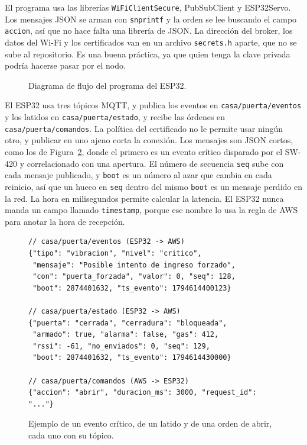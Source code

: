 \documentclass[manuscript,screen,nonacm]{acmart}
\begin{document}
El programa usa las librerías \texttt{WiFiClientSecure}, PubSubClient y ESP32Servo. Los mensajes JSON se arman con \texttt{snprintf} y la orden se lee buscando el campo \texttt{accion}, así que no hace falta una librería de JSON. La dirección del broker, los datos del Wi-Fi y los certificados van en un archivo \texttt{secrets.h} aparte, que no se sube al repositorio. Es una buena práctica, ya que quien tenga la clave privada podría hacerse pasar por el nodo.

\begin{figure}[htbp]
\centering
{}
\caption{Diagrama de flujo del programa del ESP32.}
\label{fig:flujo}
\end{figure}

El ESP32 usa tres tópicos MQTT, y publica los eventos en \texttt{casa/\allowbreak puerta/\allowbreak eventos} y los latidos en \texttt{casa/\allowbreak puerta/\allowbreak estado}, y recibe las órdenes en \texttt{casa/\allowbreak puerta/\allowbreak comandos}. La política del certificado no le permite usar ningún otro, y publicar en uno ajeno corta la conexión. Los mensajes son JSON cortos, como los de Figura~\ref{fig:mensaje}, donde el primero es un evento crítico disparado por el SW-420 y correlacionado con una apertura. El número de secuencia \texttt{seq} sube con cada mensaje publicado, y \texttt{boot} es un número al azar que cambia en cada reinicio, así que un hueco en \texttt{seq} dentro del mismo \texttt{boot} es un mensaje perdido en la red. La hora en milisegundos permite calcular la latencia. El ESP32 nunca manda un campo llamado \texttt{timestamp}, porque ese nombre lo usa la regla de AWS para anotar la hora de recepción.

\begin{figure}[htbp]
\centering
\begin{minipage}{0.95\linewidth}
\begin{lstlisting}
// casa/puerta/eventos (ESP32 -> AWS)
{"tipo": "vibracion", "nivel": "critico",
 "mensaje": "Posible intento de ingreso forzado",
 "con": "puerta_forzada", "valor": 0, "seq": 128,
 "boot": 2874401632, "ts_evento": 1794614400123}

// casa/puerta/estado (ESP32 -> AWS)
{"puerta": "cerrada", "cerradura": "bloqueada",
 "armado": true, "alarma": false, "gas": 412,
 "rssi": -61, "no_enviados": 0, "seq": 129,
 "boot": 2874401632, "ts_evento": 1794614430000}

// casa/puerta/comandos (AWS -> ESP32)
{"accion": "abrir", "duracion_ms": 3000, "request_id": "..."}
\end{lstlisting}
\end{minipage}
\caption{Ejemplo de un evento crítico, de un latido y de una orden de abrir, cada uno con su tópico.}
\label{fig:mensaje}
\end{figure}
\end{document}
